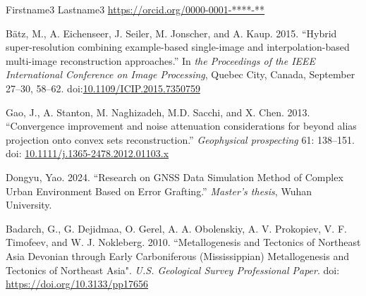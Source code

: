 \documentclass[12pt]{gsis}  %
\begin{document}
\noindent Firstname3 Lastname3    \quad     \url{https://orcid.org/0000-0001-****-**}



\begin{thebibliography}{}

B{\"a}tz, M., A. Eichenseer, J. Seiler, M. Jonscher, and
  A. Kaup. 2015. ``Hybrid super-resolution combining example-based
  single-image and interpolation-based multi-image reconstruction approaches.''
  In \emph{the Proceedings of the IEEE International Conference on Image
  Processing}, Quebec City, Canada, September 27–30, 58--62. doi:\url{10.1109/ICIP.2015.7350759}


Gao, J., A. Stanton, M. Naghizadeh, M.D. Sacchi, and
  X. Chen. 2013. ``Convergence improvement and noise attenuation
  considerations for beyond alias projection onto convex sets reconstruction.''
  \emph{Geophysical prospecting} 61: 138--151. doi: \url{10.1111/j.1365-2478.2012.01103.x}

Dongyu, Yao. 2024. ``Research on GNSS Data Simulation Method of Complex Urban Environment Based on Error Grafting.” \emph{Master’s thesis}, Wuhan University.


Badarch, G., G. Dejidmaa, O. Gerel, A. A. Obolenskiy, A. V. Prokopiev, V. F. Timofeev, and W. J. Nokleberg. 2010. ``Metallogenesis and Tectonics of Northeast Asia Devonian through Early Carboniferous (Mississippian) Metallogenesis and Tectonics of Northeast Asia". \emph{U.S. Geological Survey Professional Paper}. doi: \url{https://doi.org/10.3133/pp17656}

\end{thebibliography}


%
%
\end{document}
